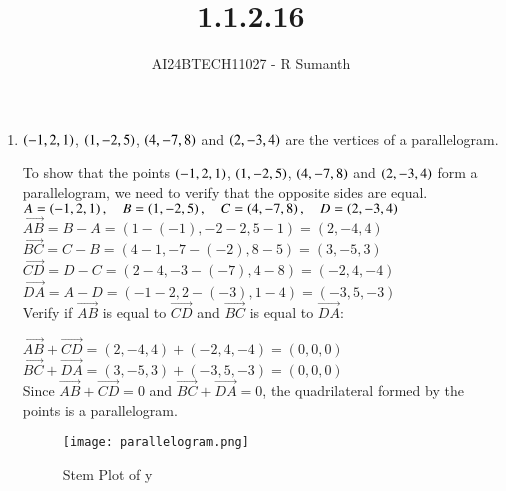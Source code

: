 \documentclass[journal]{IEEEtran}
\begin{document}

\vspace{3cm}

\title{1.1.2.16}
\author{AI24BTECH11027 - R Sumanth}
{\let\newpage\relax\maketitle}

\renewcommand{\thefigure}{\theenumi}
\renewcommand{\thetable}{\theenumi}
\setlength{\intextsep}{10pt} %
\begin{enumerate}


\item $\left(-1,2,1\right)$, $\left(1,-2,5\right)$, $\left(4,-7,8\right)$ and $\left(2,-3,4\right)$ are the vertices of a parallelogram. 

\solution

To show that the points $\left(-1, 2, 1\right)$, $\left(1, -2, 5\right)$, $\left(4, -7, 8\right)$ and $\left(2, -3, 4\right)$ form a parallelogram, we need to verify that the opposite sides are equal.\\

$A = \left(-1, 2, 1\right), \quad B = \left(1, -2, 5\right), \quad C = \left(4, -7, 8\right), \quad D = \left(2, -3, 4\right)$ \\


$\overrightarrow{AB} = B - A = (1 - (-1), -2 - 2, 5 - 1) = (2, -4, 4)$ \\

$\overrightarrow{BC} = C - B = (4 - 1, -7 - (-2), 8 - 5) = (3, -5, 3)$ \\

$\overrightarrow{CD} = D - C = (2 - 4, -3 - (-7), 4 - 8) = (-2, 4, -4)$ \\

$\overrightarrow{DA} = A - D = (-1 - 2, 2 - (-3), 1 - 4) = (-3, 5, -3)$ \\

Verify if $\overrightarrow{AB}$ is equal to $ \overrightarrow{CD} $ and $ \overrightarrow{BC} $ is equal to $ \overrightarrow{DA} $:

$\overrightarrow{AB} + \overrightarrow{CD} = (2, -4, 4) + (-2, 4, -4) = (0, 0, 0)$ \\

$\overrightarrow{BC} + \overrightarrow{DA} = (3, -5, 3) + (-3, 5, -3) = (0, 0, 0)$ \\

Since $\overrightarrow{AB} + \overrightarrow{CD} = 0 $ and $ \overrightarrow{BC} + \overrightarrow{DA} = 0 $, the quadrilateral formed by the points is a parallelogram.

\begin{figure}[h!]
   \centering
	\texttt{[image: parallelogram.png]}
   \caption{Stem Plot of y}
   \label{stemplot}
\end{figure}


\renewcommand{\thetable}{\theenumi}

\end{enumerate}
\end{document}
